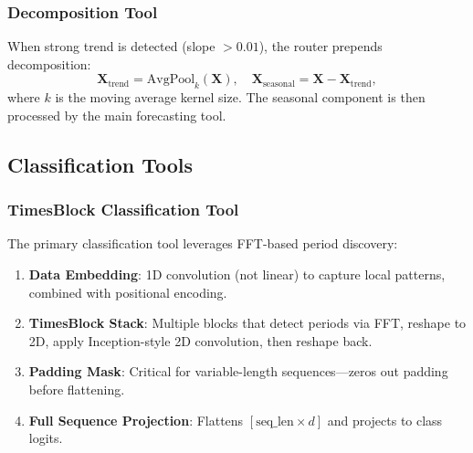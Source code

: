 \subsubsection{Decomposition Tool}
When strong trend is detected (slope $> 0.01$), the router prepends decomposition:
\begin{equation}
    \mathbf{X}_{\text{trend}} = \text{AvgPool}_{k}(\mathbf{X}), \quad \mathbf{X}_{\text{seasonal}} = \mathbf{X} - \mathbf{X}_{\text{trend}},
\end{equation}
where $k$ is the moving average kernel size. The seasonal component is then processed by the main forecasting tool.

\subsection{Classification Tools}
\label{appx:classification_tools}

\begin{table}[h]
\centering
\caption{Classification Tools Overview}
\label{tab:classification_tools}
\end{table}

\subsubsection{TimesBlock Classification Tool}
The primary classification tool leverages FFT-based period discovery:
\begin{enumerate}[leftmargin=*, itemsep=1pt]
    \item \textbf{Data Embedding}: 1D convolution (not linear) to capture local patterns, combined with positional encoding.
    \item \textbf{TimesBlock Stack}: Multiple blocks that detect periods via FFT, reshape to 2D, apply Inception-style 2D convolution, then reshape back.
    \item \textbf{Padding Mask}: Critical for variable-length sequences---zeros out padding before flattening.
    \item \textbf{Full Sequence Projection}: Flattens $[\text{seq\_len} \times d]$ and projects to class logits.
\end{enumerate}

